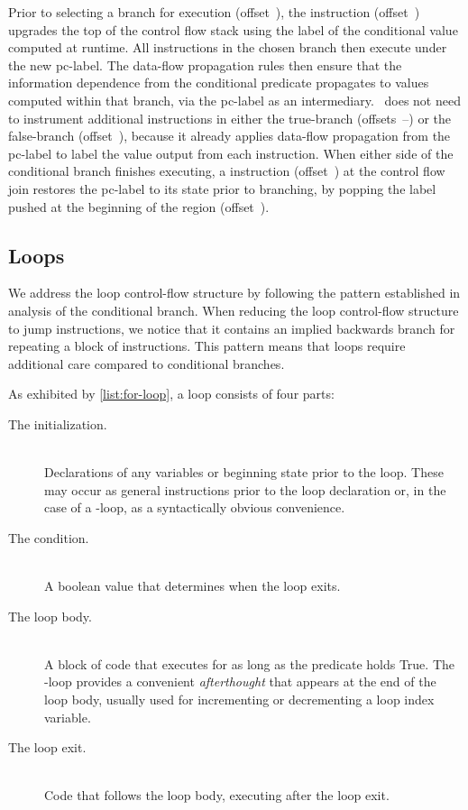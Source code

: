 Prior to selecting a branch for execution (offset~), the \join instruction (offset~) upgrades the top of the control flow stack using the label of the conditional value computed at runtime.
All instructions in the chosen branch then execute under the new pc-label.
The data-flow propagation rules then ensure that the information dependence from the conditional predicate propagates to values computed within that branch, via the pc-label as an intermediary.
\FlowCore\ does not need to instrument additional instructions in either the true-branch (offsets~--) or the false-branch (offset~), because it already applies data-flow propagation from the pc-label to label the value output from each instruction.
When either side of the conditional branch finishes executing, a \popj instruction (offset~) at the control flow join restores the pc-label to its state prior to branching, by popping the label pushed at the beginning of the region (offset~).

\subsection{Loops}

We address the loop control-flow structure by following the pattern established in analysis of the conditional branch.
When reducing the loop control-flow structure to jump instructions, we notice that it contains an implied backwards branch for repeating a block of instructions.
This pattern means that loops require additional care compared to conditional branches.

As exhibited by \autoref{list:for-loop}, a loop consists of four parts:
\begin{description}
  \item [The initialization.] \hfill \\
    Declarations of any variables or beginning state prior to the loop.
    These may occur as general instructions prior to the loop declaration or, in the case of a -loop, as a syntactically obvious convenience.
  \item [The condition.] \hfill \\
    A boolean value that determines when the loop exits.
  \item [The loop body.] \hfill \\
    A block of code that executes for as long as the predicate holds True.
    The -loop provides a convenient \emph{afterthought} that appears at the end of the loop body, usually used for incrementing or decrementing a loop index variable.
  \item [The loop exit.] \hfill \\
    Code that follows the loop body, executing after the loop exit.
\end{description}

